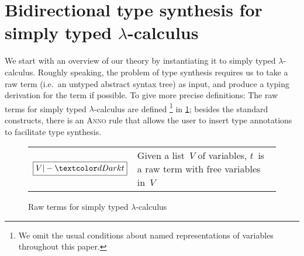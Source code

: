 
\section{Bidirectional type synthesis for simply typed \texorpdfstring{$\lambda$}{λ}-calculus} \label{sec:key-ideas}


We start with an overview of our theory by instantiating it to simply typed $\lambda$-calculus.
Roughly speaking, the problem of type synthesis requires us to take a raw term (i.e.~an untyped abstract syntax tree) as input, and produce a typing derivation for the term if possible.
To give more precise definitions:
The raw terms for simply typed $\lambda$-calculus are defined%
\footnote{We omit the usual conditions about named representations of variables throughout this paper.}
in \cref{fig:STLC-raw-terms};
besides the standard constructs, there is an \textsc{Anno} rule that allows the user to insert type annotations to facilitate type synthesis.

\begin{figure}
  \small
  \bgroup
  \renewcommand{\arraystretch}{1.5}
  \begin{tabular}{ r l }
    $\boxed{V |- \isTerm{t}}$ & Given a list~$V$ of variables, $t$~is a raw term with free variables in~$V$
  \end{tabular}
  \egroup
  \centering
  \caption{Raw terms for simply typed $\lambda$-calculus}
  \label{fig:STLC-raw-terms}
\end{figure}

